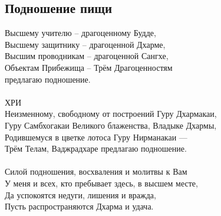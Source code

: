 \newpage
\subsection{Подношение пищи}

\vspace{1cm}
Высшему учителю – драгоценному Будде, \\
Высшему защитнику –  драгоценной Дхарме,\\
Высшим проводникам –  драгоценной Сангхе,\\
Объектам Прибежища – Трём Драгоценностям \\ \indent предлагаю подношение.\\
\\
ХРИ\\
Неизменному, свободному от построений Гуру Дхармакаи, \\
Гуру Самбхогакаи Великого блаженства, Владыке Дхармы, \\
Родившемуся в цветке лотоса Гуру Нирманакаи — \\
Трём Телам, Ваджрадхаре предлагаю подношение.\\
\\
Силой подношения, восхваления и молитвы к Вам \\
У меня и всех, кто пребывает здесь, в высшем месте, \\
Да успокоятся недуги, лишения и вражда, \\
Пусть распространяются Дхарма и удача.\\
\\


